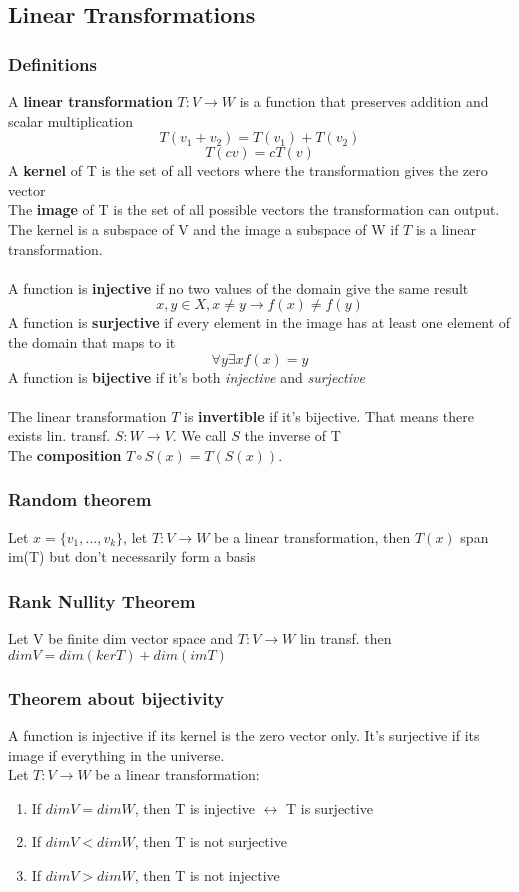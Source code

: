 \documentclass{article}
\begin{document}
\subsection{Linear Transformations}
\subsubsection{Definitions}
A \textbf{linear transformation} $T:V\rightarrow W$ is a function that preserves addition and scalar multiplication 
\[T(v_1+v_2) = T(v_1) + T(v_2)\]
\[T(cv) = cT(v)\]
A \textbf{kernel} of T is the set of all vectors where the transformation gives the zero vector\\
The \textbf{image} of T is the set of all possible vectors the transformation can output.\\
The kernel is a subspace of V and the image a subspace of W if $T$ is a linear transformation.
\\\\
A function is \textbf{injective} if no two values of the domain give the same result 
\[x,y\in X,x\ne y \rightarrow f(x)\ne f(y)\]
A function is \textbf{surjective} if every element in the image has at least one element of the domain that maps to it
\[\forall y\exists x f(x) = y \]
A function is \textbf{bijective} if it's both \textit{injective} and \textit{surjective}
\\\\
The linear transformation $T$ is \textbf{invertible} if it's bijective. That means there exists lin. transf. $S:W\rightarrow V$. We call $S$ the inverse of T
\\
The \textbf{composition} $T\circ S(x)= T(S(x))$. 
\subsubsection{Random theorem}
Let $x=\{v_1,...,v_k\}$, let $T:V\rightarrow W$ be a linear transformation, then $T(x)$ span im(T) but don't necessarily form a  basis
\subsubsection{Rank Nullity Theorem}
Let V be finite dim vector space and $T:V\rightarrow W$ lin transf. then $dimV=dim(kerT)+dim(imT)$
\subsubsection{Theorem about bijectivity}
A function is injective if its kernel is the zero vector only. It's surjective if its image if everything in the universe.\\
Let $T:V\rightarrow W$ be a linear transformation:
\begin{enumerate}
    \item If $dimV=dimW$, then T is injective $\leftrightarrow$ T is surjective
    \item If $dimV<dimW$, then T is not surjective
    \item If $dimV>dimW$, then T is not injective
\end{enumerate}
\end{document}
